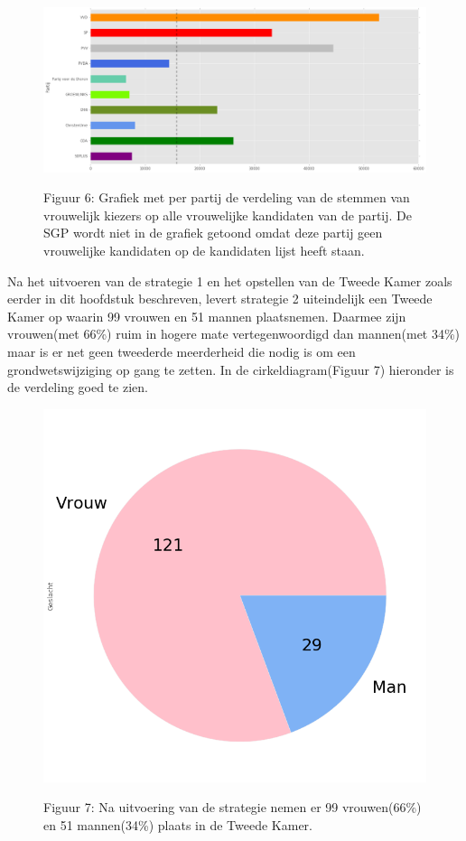 \begin{figure}[H]
\begin{center}
	\includegraphics[width=\linewidth]	{stemmen_op_vrouwen_willekeurig.png}
		\begin{center}
			Figuur 6: Grafiek met per partij de verdeling van de stemmen van vrouwelijk kiezers op alle vrouwelijke kandidaten van de partij. De SGP wordt niet in de grafiek getoond omdat deze partij geen vrouwelijke kandidaten op de kandidaten lijst heeft staan. 
		\end{center}
\end{center}
\end{figure}

Na het uitvoeren van de strategie 1 en het opstellen van de Tweede Kamer zoals eerder in dit hoofdstuk beschreven, levert strategie 2 uiteindelijk een Tweede Kamer op waarin 99 vrouwen en 51 mannen plaatsnemen. Daarmee zijn vrouwen(met 66\%) ruim in hogere mate vertegenwoordigd dan mannen(met 34\%) maar is er net geen tweederde meerderheid die nodig is om een grondwetswijziging op gang te zetten. In de cirkeldiagram(Figuur 7) hieronder is de verdeling goed te zien. 

\begin{figure}[H]
\begin{center}
	\includegraphics[width=0.7\linewidth]{pie_chart_topN.png}
		\begin{center}
			Figuur 7: Na uitvoering van de strategie nemen er 99 vrouwen(66\%) en 51 mannen(34\%) plaats in de Tweede Kamer. 
		\end{center}
\end{center}
\end{figure}

